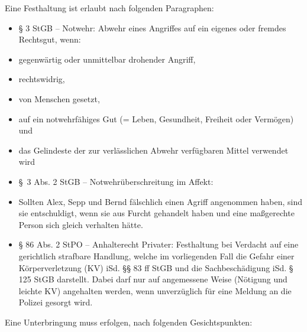 \documentclass{article}
\begin{document}
Eine Festhaltung ist erlaubt nach folgenden Paragraphen:

\begin{itemize}
\item {\S} 3 StGB -- Notwehr: Abwehr eines Angriffes auf ein eigenes
oder fremdes Rechtsgut, wenn:

\end{itemize}
\begin{itemize}
\item gegenw\"artig oder unmittelbar drohender Angriff,

\item rechtswidrig,

\item von Menschen gesetzt,

\item auf ein notwehrf\"ahiges Gut (= Leben, Gesundheit, Freiheit oder
Verm\"ogen) und

\item das Gelindeste der zur verl\"asslichen Abwehr verf\"ugbaren Mittel
verwendet wird

\end{itemize}
\begin{itemize}
\item {\S}~3 Abs. 2 StGB -- Notwehr\"uberschreitung im Affekt:

\end{itemize}
\begin{itemize}
\item Sollten Alex, Sepp und Bernd f\"alschlich einen Agriff angenommen
haben, sind sie entschuldigt, wenn sie aus Furcht gehandelt haben und
eine ma{\ss}gerechte Person sich gleich verhalten h\"atte. 

\end{itemize}
\begin{itemize}
\item {\S} 86 Abs. 2 StPO -- Anhalterecht Privater: Festhaltung bei
Verdacht auf eine gerichtlich strafbare Handlung, welche im
vorliegenden Fall die Gefahr einer K\"orperverletzung (KV) iSd.
{\S}{\S} 83 ff StGB und die Sachbesch\"adigung iSd. {\S} 125 StGB
darstellt. Dabei darf nur auf angemessene Weise (N\"otigung und leichte
KV) angehalten werden, wenn unverz\"uglich f\"ur eine Meldung an die
Polizei gesorgt wird.

\end{itemize}
Eine Unterbringung muss erfolgen, nach folgenden Gesichtspunkten:
\end{document}
